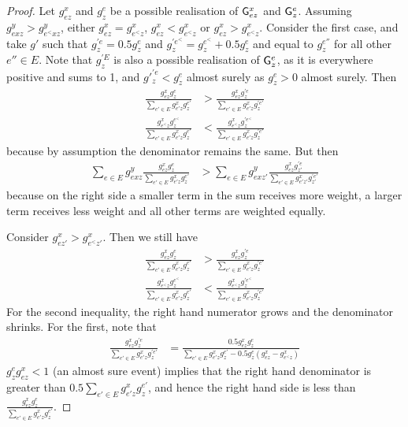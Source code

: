 \begin{proof}
Let $g^x_{ez}$ and $g^e_z$ be a possible realisation of $\mathsf{G}^x_{ez}$ and $\mathsf{G}^e_z$. Assuming $g^y_{exz} > g^y_{e^<xz}$, either $g^x_{ez}=g^x_{e^<z}$, $g^x_{ez}< g^x_{e^<z}$ or $g^x_{ez}>g^x_{e^<z}$. Consider the first case, and take $g'$ such that $g^{\prime e}_{z}=0.5g^{e}_{z}$ and $g^{\prime e^<}_{z}=g^{e^<}_{z}+0.5g^{e}_{z}$ and equal to $g^{e''}_z$ for all other $e''\in E$. Note that $g^{\prime E}_z$ is also a possible realisation of $\mathsf{G}^e_z$, as it is everywhere positive and sums to 1, and $g'^{\prime e}_{z}<g^{e}_{z}$ almost surely as $g^{e}_{z}>0$ almost surely. Then
\begin{align}
    \frac{g^x_{ez}g^e_z}{\sum_{e'\in E}g^x_{e'z}g^{e'}_z} &> \frac{g^x_{ez}g^{\prime e}_z}{\sum_{e'\in E}g^x_{e'z}g^{\prime e'}_z}\\
    \frac{g^x_{e^<z}g^{e^<}_z}{\sum_{e'\in E}g^x_{e'z}g^{e'}_z} &< \frac{g^x_{e^<z}g^{\prime e^<}_z}{\sum_{e'\in E}g^x_{e'z}g^{\prime e'}_z}
\end{align}
because by assumption the denominator remains the same. But then
\begin{align}
    \sum_{e\in E} g^y_{exz}\frac{g^x_{ez}g^e_z}{\sum_{e'\in E}g^x_{e'z}g^{e'}_z}&> \sum_{e\in E} g^y_{exz'}\frac{g^x_{ez}g^{\prime e}_{z'}}{\sum_{e'\in E}g^x_{e'z'}g^{\prime e'}_{z'}}\label{eqApp:inequality}
\end{align}
because on the right side a smaller term in the sum receives more weight, a larger term receives less weight and all other terms are weighted equally.

Consider $g^x_{ez'}>g^x_{e^<z'}$. Then we still have
\begin{align}
    \frac{g^x_{ez}g^e_z}{\sum_{e'\in E}g^x_{e'z}g^{e'}_z} &> \frac{g^x_{ez}g^{\prime e}_z}{\sum_{e'\in E}g^x_{e'z}g^{\prime e'}_z}\\
    \frac{g^x_{e^<z}g^{e^<}_z}{\sum_{e'\in E}g^x_{e'z}g^{e'}_z} &< \frac{g^x_{e^<z}g^{\prime e^<}_z}{\sum_{e'\in E}g^x_{e'z}g^{\prime e'}_z}
\end{align}
For the second inequality, the right hand numerator grows and the denominator shrinks. For the first, note that
\begin{align}
    \frac{g^x_{ez}g^{\prime e}_z}{\sum_{e'\in E}g^x_{e'z}g^{\prime e'}_z} &= \frac{0.5 g^x_{ez}g^{e}_z}{\sum_{e'\in E}g^x_{e'z}g^{e'}_z - 0.5 g^{e}_z (g^x_{ez} - g^x_{e^< z})}
\end{align}
$g^e_z g^x_{ez}<1$ (an almost sure event) implies that the right hand denominator is greater than $0.5 \sum_{e'\in E}g^x_{e'z}g^{e'}_z$, and hence the right hand side is less than $\frac{g^x_{ez}g^e_z}{\sum_{e'\in E}g^x_{e'z}g^{e'}_z}$.


\end{proof}
